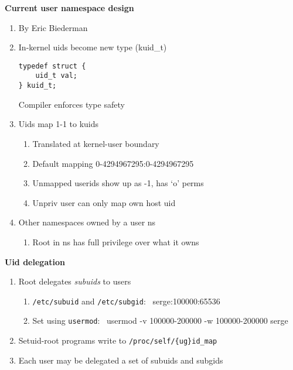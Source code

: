 \documentclass{beamer}
\begin{document}
\begin{frame}[fragile]
\textbf{Current user namespace design}
\begin{enumerate}
\item By Eric Biederman
\item In-kernel uids become new type (kuid\_t)
\begin{verbatim}
typedef struct {
	uid_t val;
} kuid_t;
\end{verbatim}
Compiler enforces type safety
\item Uids map 1-1 to kuids
	\begin{enumerate}
	\item Translated at kernel-user boundary
	\item Default mapping 0-4294967295:0-4294967295
	\item Unmapped userids show up as -1, has `o' perms
	\item Unpriv user can only map own host uid
	\end{enumerate}
\item Other namespaces owned by a user ns
	\begin{enumerate}
	\item Root in ns has full privilege over what it owns
	\end{enumerate}
\end{enumerate}
\end{frame}

\begin{frame}
\textbf{Uid delegation}
\begin{enumerate}
\item Root delegates {\em subuids} to users
	\begin{enumerate}
	\item {\tt /etc/subuid} and {\tt /etc/subgid}: \
serge:100000:65536
	\item Set using {\tt usermod}: \
usermod -v 100000-200000 -w 100000-200000 serge
	\end{enumerate}
\item Setuid-root programs write to {\tt /proc/self/\{ug\}id\_map}
\item Each user may be delegated a set of subuids and subgids
\end{enumerate}
\end{frame}
\end{document}
